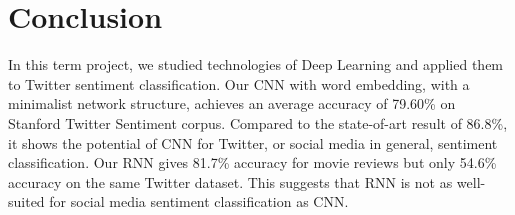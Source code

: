 \section{Conclusion}\label{sec.conclusion}

In this term project, we studied technologies of Deep Learning and applied them to Twitter sentiment classification. Our CNN with word embedding, with a minimalist network structure, achieves an average accuracy of 79.60\% on Stanford Twitter Sentiment corpus. Compared to the state-of-art result of 86.8\%, it shows the potential of CNN for Twitter, or social media in general, sentiment classification. Our RNN gives 81.7\% accuracy for movie reviews but only 54.6\% accuracy on the same Twitter dataset. This suggests that RNN is not as well-suited for social media sentiment classification as CNN.
